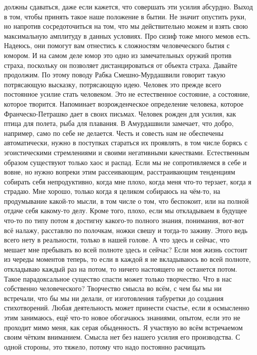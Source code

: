 должны сдаваться, даже если кажется, что совершать эти усилия абсурдно. Выход в
том, чтобы принять такое наше положение в бытии. Не значит опустить руки, но
напротив сосредоточиться на том, что мы действительно можем и взять свою
максимальную амплитуду в данных условиях. Про сизиф тоже много мемов есть.
Надеюсь, они помогут вам отнестись к сложностям человеческого бытия с юмором. И
на самом деле юмор это одно из замечательных оружий против страха, поскольку он
позволяет дистанцироваться от объекта страха. Давайте продолжим. По этому поводу
Рабка Смешно-Мурдашвили говорит такую потрясающую высказку, потрясающую идею.
Человек это прежде всего постоянное усилие стать человеком. Это не естественное
состояние, а состояние, которое творится. Напоминает возрожденческое определение
человека, которое Франческо-Петрашко дает в своих письмах. Человек рожден для
усилия, как птица для полета, рыба для плавания. В Амурдашвили замечает, что
добро, например, само по себе не делается. Честь и совесть нам не обеспечены
автоматически, нужно в поступках стараться их проявлять, в том числе борясь с
эгоистическими стремлениями и своими негативными качествами. Естественным
образом существуют только хаос и распад. Если мы не сопротивляемся в себе и
вовне, но нужно вопреки этим рассеивающим, расстраивающим тенденциям собирать
себя непродуктивно, когда мне плохо, когда меня что-то терзает, когда я страдаю.
Мне хорошо, только когда я целиком собираюсь на чём-то, на продумывание какой-то
мысли, в том числе о том, что беспокоит, или на полной отдаче себя какому-то
делу. Кроме того, плохо, если мы откладываем в будущее что-то по типу потом я
достигну какого-то полного знания, понимания, вот-вот всё налажу, расставлю по
полочкам, ножки свешу и тогда-то заживу. Этого ведь всего нету в реальности,
только в нашей голове. А что здесь и сейчас, что мешает мне пребывать во всей
полноте здесь и сейчас? Если моя жизнь состоит из череды моментов теперь, то
если в каждой я не вкладываюсь во всей полноте, откладываю каждый раз на потом,
то ничего настоящего не останется потом. Такое парадоксальное существо спасти
может только творчество. Что в нас собственно человеческого? Творчество смысла
во всём, с чем бы мы ни встречали, что бы мы ни делали, от изготовления
табуретки до создания стихотворений. Любая деятельность может принести счастье,
если я осмысленно этим занимаюсь, ещё что-то новое обогачаюсь знаниями, опытом,
если это не проходит мимо меня, как серая обыденность. Я участвую во всём
встречаемом своим чётким вниманием. Смысла нет без нашего усилия его
производства. С одной стороны, это тяжело, потому что надо постоянно расчищать
